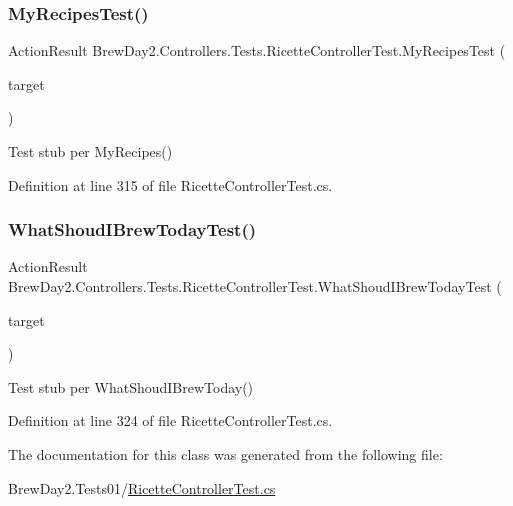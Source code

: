 \subsubsection{\texorpdfstring{My\+Recipes\+Test()}{MyRecipesTest()}}
{\footnotesize\ttfamily Action\+Result Brew\+Day2.\+Controllers.\+Tests.\+Ricette\+Controller\+Test.\+My\+Recipes\+Test (\begin{DoxyParamCaption}\item[{\mbox{[}\+Pex\+Assume\+Under\+Test\mbox{]} \mbox{\hyperlink{class_brew_day2_1_1_controllers_1_1_ricette_controller}{Ricette\+Controller}}}]{target }\end{DoxyParamCaption})}



Test stub per My\+Recipes()



Definition at line 315 of file Ricette\+Controller\+Test.\+cs.

\mbox{\label{class_brew_day2_1_1_controllers_1_1_tests_1_1_ricette_controller_test_a779126b201c0615aed5a7e711652ea0e}} 
\subsubsection{\texorpdfstring{What\+Shoud\+I\+Brew\+Today\+Test()}{WhatShoudIBrewTodayTest()}}
{\footnotesize\ttfamily Action\+Result Brew\+Day2.\+Controllers.\+Tests.\+Ricette\+Controller\+Test.\+What\+Shoud\+I\+Brew\+Today\+Test (\begin{DoxyParamCaption}\item[{\mbox{[}\+Pex\+Assume\+Under\+Test\mbox{]} \mbox{\hyperlink{class_brew_day2_1_1_controllers_1_1_ricette_controller}{Ricette\+Controller}}}]{target }\end{DoxyParamCaption})}



Test stub per What\+Shoud\+I\+Brew\+Today()



Definition at line 324 of file Ricette\+Controller\+Test.\+cs.



The documentation for this class was generated from the following file\+:\begin{DoxyCompactItemize}
\item 
Brew\+Day2.\+Tests01/\mbox{\hyperlink{1_2_ricette_controller_test_8cs}{Ricette\+Controller\+Test.\+cs}}\end{DoxyCompactItemize}
